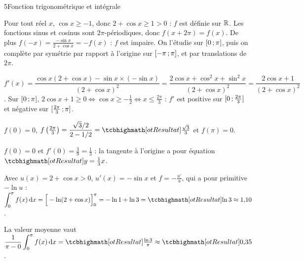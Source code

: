 \begin{corrigeBac}{5}{Fonction trigonométrique et intégrale}
\begin{questions}
  \item Pour tout réel $x$, $\cos x\geq-1$, donc $2+\cos x\geq1>0$ : $f$ est définie sur $\mathbb{R}$. Les fonctions sinus et cosinus sont
    $2\pi$-périodiques, donc $f(x+2\pi)=f(x)$. De plus $f(-x)=\frac{-\sin x}{2+\cos x}=-f(x)$ : $f$ est impaire. On l'étudie sur
    $\mathopen{[}0\,{;}\,\pi\mathclose{]}$, puis on complète par symétrie par rapport à l'origine sur $\mathopen{[}-\pi\,{;}\,\pi\mathclose{]}$, et par translations de $2\pi$. \pts{1 pt}
  \item $f'(x)=\dfrac{\cos x(2+\cos x)-\sin x\times(-\sin x)}{(2+\cos x)^{2}}=\dfrac{2\cos x+\cos^{2}x+\sin^{2}x}{(2+\cos x)^{2}}
    =\dfrac{2\cos x+1}{(2+\cos x)^{2}}$. Sur $\mathopen{[}0\,{;}\,\pi\mathclose{]}$, $2\cos x+1\geq0\iff\cos x\geq-\frac12\iff x\leq\frac{2\pi}{3}$ :
    $f'$ est positive sur $\mathopen{[}0\,{;}\,\frac{2\pi}3\mathclose{]}$ et négative sur $\mathopen{[}\frac{2\pi}3\,{;}\,\pi\mathclose{]}$. \pts{1 pt}
  \item $f(0)=0$, $f\left(\frac{2\pi}{3}\right)=\dfrac{\sqrt3/2}{2-1/2}=\res{\tfrac{\sqrt3}{3}}$ et $f(\pi)=0$.
\begin{center}
\begin{tableau}
\end{tableau}
\end{center}
    \pts{1 pt}
  \item $f(0)=0$ et $f'(0)=\frac{3}{9}=\frac13$ : la tangente à l'origine a pour équation $\res{y=\tfrac13x}$. 
\end{questions}
\begin{questions}[resume]
  \item Avec $u(x)=2+\cos x>0$, $u'(x)=-\sin x$ et $f=-\frac{u'}{u}$, qui a pour primitive $-\ln u$ :
    $\displaystyle\int_0^{\pi}f(x)\,\mathrm{d}x=\Big[-\ln(2+\cos x)\Big]_0^{\pi}=-\ln1+\ln3=\res{\ln3}\approx1{,}10$. \pts{1 pt}
  \item La valeur moyenne vaut $\dfrac1{\pi-0}\displaystyle\int_0^{\pi}f(x)\,\mathrm{d}x=\res{\tfrac{\ln3}{\pi}}\approx\res{0{,}35}$. 
\end{questions}
\end{corrigeBac}
